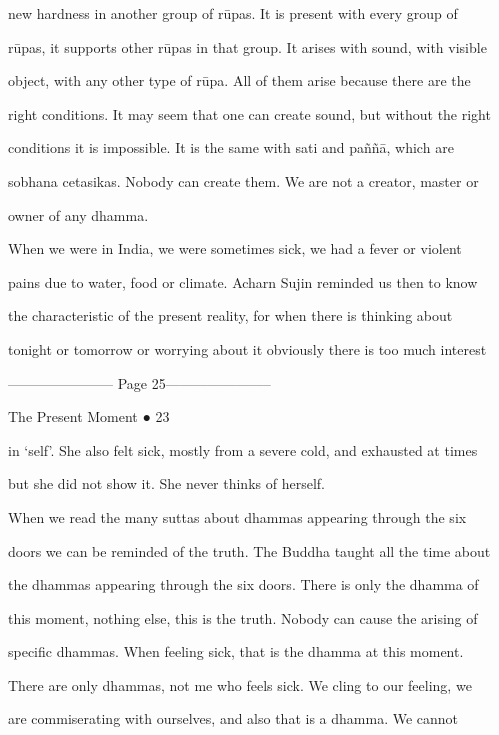 new   hardness  in  another  group  of  rūpas.  It  is  present  with  every  group  of  

rūpas, it supports other rūpas in that group. It arises with sound, with visible  

object, with  any  other  type  of  rūpa. All  of  them  arise because  there  are  the  

right conditions. It may seem that one can create sound, but without the right  

conditions  it  is  impossible.  It  is  the   same  with   sati  and  paññā,  which   are  

sobhana cetasikas. Nobody  can create them. We  are not  a creator, master or  

owner of any dhamma. 



When we were  in  India, we were  sometimes  sick, we had  a  fever  or violent  

pains due to water, food or climate. Acharn  Sujin reminded us then to know  

the   characteristic   of   the   present   reality,   for   when   there   is   thinking   about  

tonight or tomorrow or worrying about it obviously there is too much interest  


----------------------- Page 25-----------------------

                                                               The Present Moment ● 23 



in ‘self’.  She also felt sick, mostly from a severe cold, and exhausted at times  

but she did not show it. She never thinks of herself. 

   When we read the many suttas about dhammas appearing through the  six  

doors we can be reminded of the truth. The Buddha taught all the time about  

the dhammas  appearing through the  six doors. There is only the dhamma of  

this moment, nothing  else, this is the truth. Nobody  can  cause the  arising of  

specific  dhammas.  When  feeling  sick,  that  is  the  dhamma  at  this  moment.  

There  are only dhammas, not me who feels sick. We cling to our feeling, we  

are  commiserating  with   ourselves,  and  also  that   is  a  dhamma.  We   cannot  


